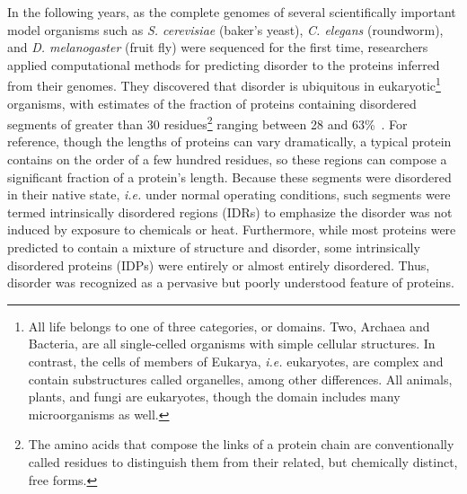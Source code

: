 In the following years, as the complete genomes of several scientifically important model organisms such as \textit{S. cerevisiae} (baker's yeast), \textit{C. elegans} (roundworm), and \textit{D. melanogaster} (fruit fly) were sequenced for the first time, researchers applied computational methods for predicting disorder to the proteins inferred from their genomes. They discovered that disorder is ubiquitous in eukaryotic\footnote{All life belongs to one of three categories, or domains. Two, Archaea and Bacteria, are all single-celled organisms with simple cellular structures. In contrast, the cells of members of Eukarya, \textit{i.e.} eukaryotes, are complex and contain substructures called organelles, among other differences. All animals, plants, and fungi are eukaryotes, though the domain includes many microorganisms as well.} organisms, with estimates of the fraction of proteins containing disordered segments of greater than 30 residues\footnote{The amino acids that compose the links of a protein chain are conventionally called residues to distinguish them from their related, but chemically distinct, free forms.} ranging between 28 and 63\%~\cite{Dunker2000, Ward2004}. For reference, though the lengths of proteins can vary dramatically, a typical protein contains on the order of a few hundred residues, so these regions can compose a significant fraction of a protein's length. Because these segments were disordered in their native state, \textit{i.e.} under normal operating conditions, such segments were termed intrinsically disordered regions (IDRs) to emphasize the disorder was not induced by exposure to chemicals or heat. Furthermore, while most proteins were predicted to contain a mixture of structure and disorder, some intrinsically disordered proteins (IDPs) were entirely or almost entirely disordered. Thus, disorder was recognized as a pervasive but poorly understood feature of proteins.


